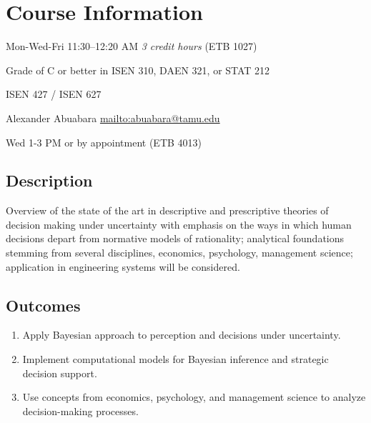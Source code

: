 \documentclass[11pt]{article}
\begin{document}
\title{}
\author{} %
\date{}
\maketitle
\vspace{-7.5em}

\section*{Course Information}
\begin{description}[nosep,leftmargin=0.5in]
\item[Time (Location)] Mon-Wed-Fri 11:30--12:20 AM \emph{3 credit hours} (ETB 1027)
\item[Prerequisites] Grade of C or better in ISEN 310, DAEN 321, or STAT 212
\item[Cross listing] ISEN 427 / ISEN 627
\item[Instructor] Alexander Abuabara \url{mailto:abuabara@tamu.edu}
\item[Course office hours (location)] Wed 1-3 PM or by appointment (ETB 4013)
\end{description}

\subsection*{Description}
Overview of the state of the art in descriptive and prescriptive theories 
of decision making under uncertainty with emphasis on the ways in which human 
decisions depart from normative models of rationality; analytical foundations 
stemming from several disciplines, economics, psychology, management science; 
application in engineering systems will be considered.

\subsection*{Outcomes}
\begin{enumerate}[leftmargin=*,nosep]
\item Apply Bayesian approach to perception and decisions under uncertainty.
\item Implement computational models for Bayesian inference and strategic decision support.
\item Use concepts from economics, psychology, and management science to analyze decision-making processes.
\end{enumerate}
\end{document}
